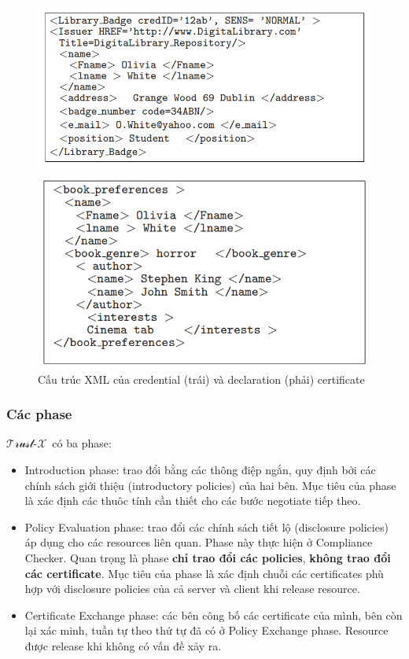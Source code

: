 \documentclass[12pt]{article}
\newcommand{\trustx}{$\mathcal{\text{Trust-}X}$\ }
\begin{document}
\begin{figure}[H]
\centering
\begin{multicols}{2}
\includegraphics[scale=.5]{img/trustx-credential.PNG}

\includegraphics[scale=.5]{img/trustx-declaration.PNG}
\end{multicols}
\caption{Cấu trúc XML của credential (trái) và declaration (phải) certificate}
\end{figure}

\subsubsection{Các phase}
\trustx có ba phase:
\begin{itemize}
\item Introduction phase: trao đổi bằng các thông điệp ngắn, quy định bởi các chính sách giới thiệu (introductory policies) của hai bên. Mục tiêu của phase là xác định các thuôc tính cần thiết cho các bước negotiate tiếp theo.
\item Policy Evaluation phase: trao đổi các chính sách tiết lộ (disclosure policies) áp dụng cho các resources liên quan. Phase này thực hiện ở Compliance Checker. Quan trọng là phase \textbf{chỉ trao đổi các policies}, \textbf{không trao đổi các certificate}. Mục tiêu của phase là xác định chuỗi các certificates phù hợp với disclosure policies của cả server và client khi release resource.
\item Certificate Exchange phase: các bên công bố các certificate của mình, bên còn lại xác minh, tuần tự theo thứ tự đã có ở Policy Exchange phase. Resource được release khi không có vấn đề xảy ra.
\end{itemize}
\end{document}
